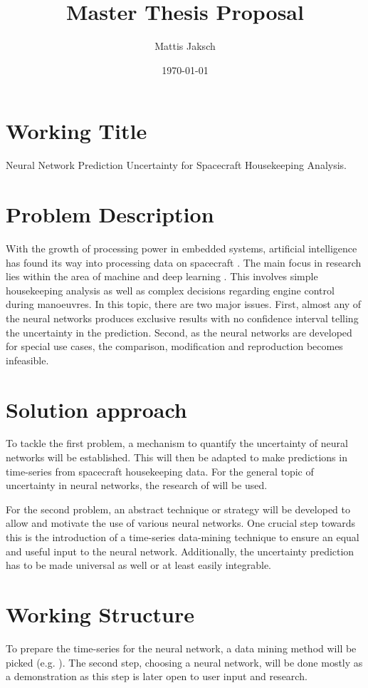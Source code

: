 \documentclass[10pt,a4paper]{scrartcl}
\title{Master Thesis Proposal}
\author{Mattis Jaksch}
\date{\today}
\begin{document}
\maketitle

\flushleft

\section*{Working Title}
Neural Network Prediction Uncertainty for Spacecraft Housekeeping Analysis.

\section*{Problem Description}
With the growth of processing power in embedded systems, artificial intelligence has found its way into processing data on spacecraft \cite{athmos} \cite{mars-entry}. The main focus in research lies within the area of machine and deep learning \cite{ai-dlr-survey} \cite{mining-survey}. This involves simple housekeeping analysis as well as complex decisions regarding engine control during manoeuvres. 
In this topic, there are two major issues. First, almost any of the neural networks produces exclusive results with no confidence interval telling the uncertainty in the prediction. Second, as the neural networks are developed for special use cases, the comparison, modification and reproduction becomes infeasible.

\section*{Solution approach}
To tackle the first problem, a mechanism to quantify the uncertainty of neural networks will be established. This will then be adapted to make predictions in time-series from spacecraft housekeeping data. For the general topic of uncertainty in neural networks, the research of \cite{yarin-thesis} will be used.

For the second problem, an abstract technique or strategy will be developed to allow and motivate the use of various neural networks. One crucial step towards this is the introduction of a time-series data-mining technique to ensure an equal and useful input to the neural network. Additionally, the uncertainty prediction has to be made universal as well or at least easily integrable.

\section*{Working Structure}
To prepare the time-series for the neural network, a data mining method will be picked (e.g. \cite{tm-mining} \cite{ssd}). The second step, choosing a neural network, will be done mostly as a demonstration as this step is later open to user input and research. 
\end{document}
